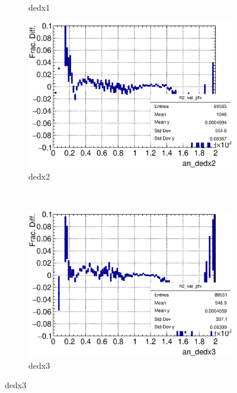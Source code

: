 \begin{figure}[t]
\begin{subfigure}{\trfigwid\textwidth}
            \caption{dedx1}
            \label{subfig:dedx1}
       \end{subfigure}
       \begin{subfigure}{\trfigwid\textwidth}
            \includegraphics[width=\textwidth]{figures/sel/ans_dedx2_vs_p_pr_res_hist2d_al2_selpr_con_slice.eps}
            \caption{dedx2}
            \label{subfig:dedx2}
       \end{subfigure}
       \\
       \begin{subfigure}{\trfigwid\textwidth}
            \includegraphics[width=\textwidth]{figures/sel/ans_dedx3_vs_p_pr_res_hist2d_al2_selpr_con_slice.eps}
            \caption{dedx3}
            \label{subfig:dedx3}
       \end{subfigure}

\end{figure}
